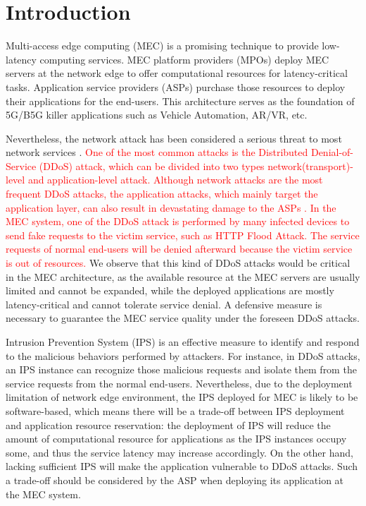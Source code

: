 \documentclass[10pt,journal, compsoc]{IEEEtran}
\begin{document}
%
\IEEEpeerreviewmaketitle
\section{Introduction}
Multi-access edge computing (MEC) is a promising technique to provide low-latency computing services. MEC platform providers (MPOs) deploy MEC servers at the network edge to offer computational resources for latency-critical tasks. Application service providers (ASPs) purchase those resources to deploy their applications for the end-users. This architecture serves as the foundation of 5G/B5G killer applications such as Vehicle Automation, AR/VR, etc.

Nevertheless, the network attack has been considered a serious threat to most network services \cite{Singh}. \textcolor{red}{One of the most common attacks is the Distributed Denial-of-Service (DDoS) attack, which can be divided into two types network(transport)-level and application-level attack\cite{Zargar}. Although network attacks are the most frequent DDoS attacks, the application attacks, which mainly target the application layer, can also result in devastating damage to the ASPs \cite{Praseed}. In the MEC system, one of the DDoS attack is performed by many infected devices to send fake requests to the victim service, such as HTTP Flood Attack. The service requests of normal end-users will be denied afterward because the victim service is out of resources.} We observe that this kind of DDoS attacks would be critical in the MEC architecture, as the available resource at the MEC servers are usually limited and cannot be expanded, while the deployed applications are mostly latency-critical and cannot tolerate service denial. A defensive measure is necessary to guarantee the MEC service quality under the foreseen DDoS attacks\cite{Tripathi}\cite{Agrawal}.

Intrusion Prevention System (IPS) is an effective measure to identify and respond to the malicious behaviors performed by attackers\cite{Nadeem}. For instance, in DDoS attacks, an IPS instance can recognize those malicious requests and isolate them from the service requests from the normal end-users\cite{Siregar}. Nevertheless, due to the deployment limitation of network edge environment, the IPS deployed for MEC is likely to be software-based, which means there will be a trade-off between IPS deployment and application resource reservation: the deployment of IPS will reduce the amount of computational resource for applications as the IPS instances occupy some, and thus the service latency may increase accordingly. On the other hand, lacking sufficient IPS will make the application vulnerable to DDoS attacks. Such a trade-off should be considered by the ASP when deploying its application at the MEC system. 
\end{document}
